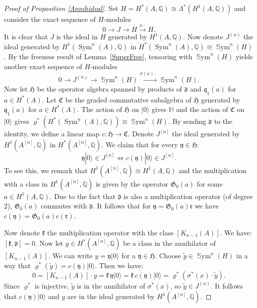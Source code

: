 \documentclass{alggeom}
\DeclareMathOperator{\Sym}{Sym}
\DeclareMathOperator{\SSym}{\mathbb{S}ym}
\renewcommand{\rho}{\varrho}
\newcommand{\hilb}[1]{^{[#1]}}
\newcommand{\vac}{|0\rangle}
\newcommand{\q}{\mathfrak{q}}
\newcommand{\kum}[2]{K_{ #2 }( #1 )}
\renewcommand{\H}{\mathbb{H}}
\newcommand{\Q}{\mathbb{Q}}
\theoremstyle{plain}
\theoremstyle{definition}
\theoremstyle{remark}
\begin{document}
\begin{proof}[Proof of Proposition \ref{Annihideal}]
Set $H=H^*(A,\Q)\cong \Lambda^*(H^1(A,\Q))$ and consider the exact sequence of $H$-modules
$$
0 \longrightarrow 
J
\longrightarrow H \stackrel{x\cdot}{\longrightarrow} H.
$$
It is clear that $J$ is the ideal in $H$ generated by $H^{1}(A,\Q)$. 
Now denote $J^{(n)}$ the ideal generated by $H^1(\Sym^n(A),\Q)$ in $H^*(\Sym^n(A),\Q)\cong\SSym^n(H)$.
By the freeness result of Lemma~\ref{SuperFree}, tensoring with $\SSym^n(H)$ yields another exact sequence of $H$-modules
$$
0 \longrightarrow {J}^{(n)} \longrightarrow \SSym^n(H) \xrightarrow{\sigma(x)\cdot} \SSym^n(H).
$$
Now let $\mathfrak{H}$ be the operator algebra spanned by products of $\mathfrak d$ and $\q_1(a)$ for $a\in H^*(A)$. Let $\mathfrak C$ be the graded commutative subalgebra of $\mathfrak H$ generated by $\q_1(a)$ for $a\in H^*(A)$. The action of $\mathfrak H$ on $\vac$ gives $\H$ and the action of $\mathfrak C$ on $\vac$ gives $\rho^*(H^*(\Sym^n(A),\Q))\cong \SSym^n(H)$.
By sending $\mathfrak d$ to the identity, we define a linear map $c : \mathfrak H \rightarrow \mathfrak C$. 
Denote $J\hilb{n}$ the ideal generated by $H^1(A\hilb{n},\Q)$ in $H^*(A \hilb n,\Q)$. We claim that for every $\mathfrak y\in \mathfrak H$:
$$
\mathfrak y\vac \in J\hilb{n} \Leftrightarrow c(\mathfrak y)\vac \in J\hilb{n}.
$$
To see this, we remark that $H^1(A \hilb n,\Q) \cong H^1(A ,\Q)  $ and the multiplication with a class in $H^1(A \hilb n,\Q) $ is given by the operator $\mathfrak G_0(a)$ for some $a\in H^1(A ,\Q)$. Due to the fact that $\mathfrak d$ is also a multiplication operator (of degree 2), $\mathfrak G_0(a)$ commutes with $\mathfrak d$. It follows that for $\mathfrak y =\mathfrak G_0(a) \mathfrak r$ we have $c(\mathfrak y) = \mathfrak G_0(a) c(\mathfrak r)$.

Now denote $\mathfrak k$ the multiplication operator with the class $[\kum{A}{n-1}]$. We have:
$
[\mathfrak k, \mathfrak d] = 0.
$
Now let $y\in H^*(A\hilb{n},\Q)$ be a class in the annihilator of $[\kum{A}{n-1}]$. We can write $y= \mathfrak y\vac$ for a $\mathfrak y\in\mathfrak H$. Choose $\tilde y \in \SSym^n (H)$ in a way that $\rho^*(\tilde y) = c(\mathfrak y) \vac$. Then we have:
$$
0=[\kum{A}{n-1}]\cdot y = \mathfrak k\, \mathfrak y \vac =  \mathfrak k \,c(\mathfrak y)\vac = \rho^*(\sigma^*(x) \cdot \tilde y).
$$
Since $\rho^*$ is injective, $\tilde y$ is in the annihilator of $\sigma^*(x)$, so $\tilde y \in J^{(n)}$. It follows that $c(\mathfrak y)\vac$ and $y$ are in the ideal generated by $H^1(A\hilb{n},\Q)$.
\end{proof}
\end{document}
